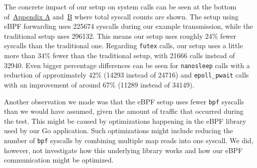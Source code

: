 The concrete impact of our setup on system calls can be seen at the bottom 
of~\hyperref[chap:appendix-fast-relay]{Appendix A} and~\hyperref[chap:appendix-plain-relay]{B} 
where total syscall counts are shown.
The setup using eBPF forwarding uses 225674 syscalls during our example transmission, while the 
traditional setup uses 296132.
This means our setup uses roughly 24\% fewer syscalls than the traditional one.
Regarding \verb|futex| calls, our setup uses a little more than 34\% 
fewer than the traditional setup, with 21666 calls instead of 32940.
Even bigger percentage differences can be seen for \verb|nanosleep| calls with a reduction of 
approximately 42\% (14293 instead of 24716) and \verb|epoll_pwait| calls with 
an improvement of around 67\% (11289 instead of 34149).

Another observation we made was that the eBPF setup uses fewer \verb|bpf| syscalls than we would have assumed,
given the amount of traffic that occurred during the test.
This might be caused by optimizations happening in the eBPF library used by our Go application.
Such optimizations might include reducing the number of \verb|bpf| syscalls 
by combining multiple map reads into one syscall.
We did, however, not investigate how this underlying library works and how our 
eBPF communication might be optimized.